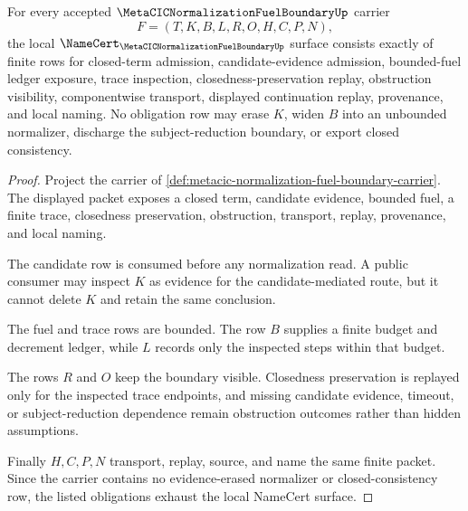 \begin{theorem}
\label{thm:metacic-normalization-fuel-boundary-namecert-obligations}
For every accepted $\MetaCICNormalizationFuelBoundaryUp$ carrier
$$
F=(T,K,B,L,R,O,H,C,P,N),
$$
the local $\NameCert_{\MetaCICNormalizationFuelBoundaryUp}$ surface consists exactly of finite rows for closed-term admission, candidate-evidence admission, bounded-fuel ledger exposure, trace inspection, closedness-preservation replay, obstruction visibility, componentwise transport, displayed continuation replay, provenance, and local naming. No obligation row may erase $K$, widen $B$ into an unbounded normalizer, discharge the subject-reduction boundary, or export closed consistency.
\end{theorem}
\begin{proof}
Project the carrier of \autoref{def:metacic-normalization-fuel-boundary-carrier}. The displayed packet exposes a closed term, candidate evidence, bounded fuel, a finite trace, closedness preservation, obstruction, transport, replay, provenance, and local naming.

The candidate row is consumed before any normalization read. A public consumer may inspect $K$ as evidence for the candidate-mediated route, but it cannot delete $K$ and retain the same conclusion.

The fuel and trace rows are bounded. The row $B$ supplies a finite budget and decrement ledger, while $L$ records only the inspected steps within that budget.

The rows $R$ and $O$ keep the boundary visible. Closedness preservation is replayed only for the inspected trace endpoints, and missing candidate evidence, timeout, or subject-reduction dependence remain obstruction outcomes rather than hidden assumptions.

Finally $H,C,P,N$ transport, replay, source, and name the same finite packet. Since the carrier contains no evidence-erased normalizer or closed-consistency row, the listed obligations exhaust the local NameCert surface.
\end{proof}

